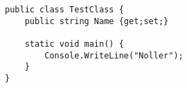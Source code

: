 \begin{lstlisting}[caption=a test for a C\# code, label=lst:test]
public class TestClass {
    public string Name {get;set;}
    
    static void main() {
        Console.WriteLine("Noller");
    }
}
\end{lstlisting}
